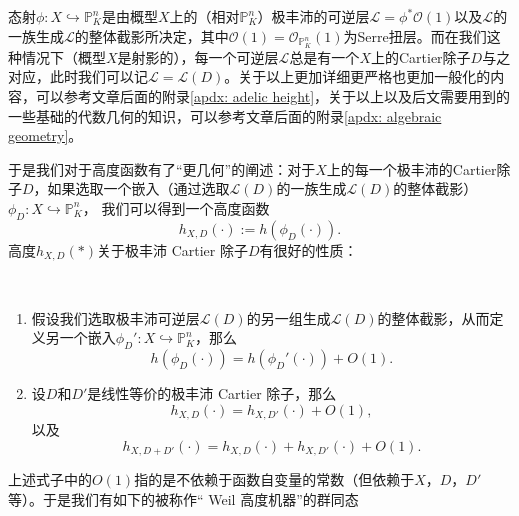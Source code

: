 态射$\phi: X \hookrightarrow \mathbb{P}^n_K$是由概型$X$上的（相对$\mathbb{P}^n_K$）极丰沛的可逆层$\mathscr{L} = \phi^{\ast}\mathcal{O}(1)$以及$\mathscr{L}$的一族生成$\mathscr{L}$的整体截影所决定，其中$\mathcal{O}(1) = \mathcal{O}_{\mathbb P^n_K}(1)$为Serre扭层。而在我们这种情况下（概型$X$是射影的），每一个可逆层$\mathscr{L}$总是有一个$X$上的Cartier除子$D$与之对应，此时我们可以记$\mathscr{L} = \mathscr{L}(D)$。关于以上更加详细更严格也更加一般化的内容，可以参考文章后面的附录\ref{apdx: adelic height}，关于以上以及后文需要用到的一些基础的代数几何的知识，可以参考文章后面的附录\ref{apdx: algebraic geometry}。

于是我们对于高度函数有了``更几何''的阐述：对于$X$上的每一个极丰沛的Cartier除子$D$，如果选取一个嵌入（通过选取$\mathscr{L}(D)$的一族生成$\mathscr{L}(D)$的整体截影）$\phi_D:X\hookrightarrow\mathbb P^n_K$，
我们可以得到一个高度函数
\begin{equation}
h_{X,D}(\cdot) := h(\phi_D(\cdot)).
\end{equation}
高度$h_{X,D}(\ast)$关于极丰沛 Cartier 除子$D$有很好的性质：
\begin{proposition} \label{height by divisor} \
\begin{enumerate}
\item 假设我们选取极丰沛可逆层$\mathscr{L}(D)$的另一组生成$\mathscr{L}(D)$的整体截影，从而定义另一个嵌入$\phi_D':X\hookrightarrow\mathbb P^n_K$，那么
\begin{equation}
h(\phi_D(\cdot)) = h(\phi_D'(\cdot)) + O(1).
\end{equation}
\item 设$D$和$D'$是线性等价的极丰沛 Cartier 除子，那么
\begin{equation}
h_{X,D}(\cdot) = h_{X,D'}(\cdot) + O(1),
\end{equation}
以及
\begin{equation}
h_{X,D+D'}(\cdot) = h_{X,D}(\cdot) + h_{X,D'}(\cdot) + O(1).
\end{equation}
\end{enumerate}
\end{proposition}
上述式子中的$O(1)$指的是不依赖于函数自变量的常数（但依赖于$X$，$D$，$D'$等）。于是我们有如下的被称作`` Weil 高度机器''的群同态


